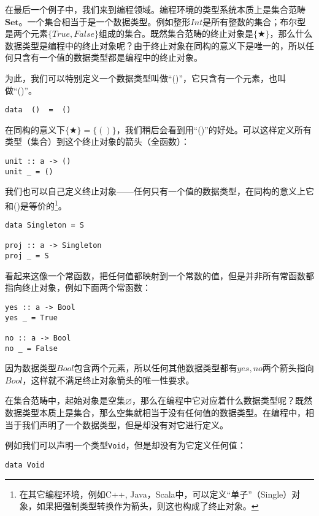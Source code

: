 \documentclass{article}
\begin{document}
\begin{example}
在最后一个例子中，我们来到编程领域。编程环境的类型系统本质上是集合范畴$\pmb{Set}$。一个集合相当于是一个数据类型。例如整形$Int$是所有整数的集合；布尔型是两个元素$\{True, False\}$组成的集合。既然集合范畴的终止对象是$\{ \bigstar \}$，那么什么数据类型是编程中的终止对象呢？由于终止对象在同构的意义下是唯一的，所以任何只含有一个值的数据类型都是编程中的终止对象。

为此，我们可以特别定义一个数据类型叫做“()”，它只含有一个元素，也叫做“()”。

\begin{lstlisting}
data  ()  =  ()
\end{lstlisting}

在同构的意义下$\{ \bigstar \} = \{()\}$，我们稍后会看到用“()”的好处。可以这样定义所有类型（集合）到这个终止对象的箭头（全函数）：

\begin{lstlisting}
unit :: a -> ()
unit _ = ()
\end{lstlisting}

我们也可以自己定义终止对象——任何只有一个值的数据类型，在同构的意义上它和()是等价的\footnote{在其它编程环境，例如C++, Java，Scala中，可以定义“单子”（Single）对象，如果把强制类型转换作为箭头，则这也构成了终止对象。}。

\begin{lstlisting}
data Singleton = S

proj :: a -> Singleton
proj _ = S
\end{lstlisting}

看起来这像一个常函数，把任何值都映射到一个常数的值，但是并非所有常函数都指向终止对象，例如下面两个常函数：

\begin{lstlisting}
yes :: a -> Bool
yes _ = True

no :: a -> Bool
no _ = False
\end{lstlisting}

因为数据类型$Bool$包含两个元素，所以任何其他数据类型都有$yes, no$两个箭头指向$Bool$，这样就不满足终止对象箭头的唯一性要求。

在集合范畴中，起始对象是空集$\varnothing$，那么在编程中它对应着什么数据类型呢？既然数据类型本质上是集合，那么空集就相当于没有任何值的数据类型。在编程中，相当于我们声明了一个数据类型，但是却没有对它进行定义。

例如我们可以声明一个类型\texttt{Void}，但是却没有为它定义任何值：

\begin{lstlisting}
data Void
\end{lstlisting}


\end{example}
\end{document}
